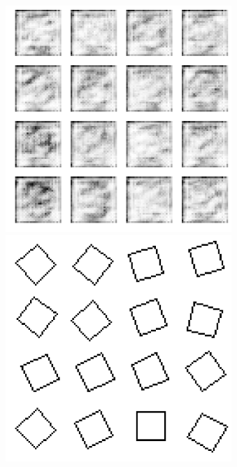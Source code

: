 \documentclass{article}
\begin{document}
\clearpage
\thispagestyle{empty}
\begin{figure}[ht]
\label{fig:gan-samples-simpleshape}
\centering
\includegraphics[height=323px]{gan-sample-fake-simpleshape.png}
\caption{}
\vspace{1em}
\includegraphics[height=323px]{gan-sample-real-simpleshape.png}
\end{figure}
\end{document}
